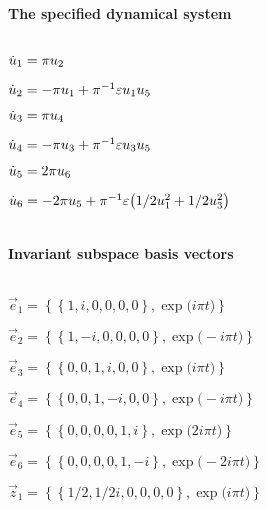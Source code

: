 
\(\)
\paragraph{The specified dynamical system}
\(
\)\par

\(\dot u_{1}=\pi  u\sb2
\)\par

\(\dot u_{2}=-\pi  u\sb1+\pi ^{-1} \varepsilon u\sb1 u\sb5
\)\par

\(\dot u_{3}=\pi  u\sb4
\)\par

\(\dot u_{4}=-\pi  u\sb3+\pi ^{-1} \varepsilon u\sb3 u\sb5
\)\par

\(\dot u_{5}=2 \pi  u\sb6
\)\par

\(\dot u_{6}=-2 \pi  u\sb5+\pi ^{-1} \varepsilon \big(1/2 u\sb1^{2}+1/2 u\sb3^{2}
\big)
\)\par

\(\)
\paragraph{Invariant subspace basis vectors}
\(
\)\par

\(\vec e_{1}=\left\{
\left\{
1 , i , 0 , 0 , 0 , 0
\right\} , \exp \big(i \pi  t\big)
\right\}
\)\par

\(\vec e_{2}=\left\{
\left\{
1 , -i , 0 , 0 , 0 , 0
\right\} , \exp \big(-i \pi  t\big)
\right\}
\)\par

\(\vec e_{3}=\left\{
\left\{
0 , 0 , 1 , i , 0 , 0
\right\} , \exp \big(i \pi  t\big)
\right\}
\)\par

\(\vec e_{4}=\left\{
\left\{
0 , 0 , 1 , -i , 0 , 0
\right\} , \exp \big(-i \pi  t\big)
\right\}
\)\par

\(\vec e_{5}=\left\{
\left\{
0 , 0 , 0 , 0 , 1 , i
\right\} , \exp \big(2 i \pi  t\big)
\right\}
\)\par

\(\vec e_{6}=\left\{
\left\{
0 , 0 , 0 , 0 , 1 , -i
\right\} , \exp \big(-2 i \pi  t\big)
\right\}
\)\par

\(\vec z_{1}=\left\{
\left\{
1/2 , 1/2 i , 0 , 0 , 0 , 0
\right\} , \exp \big(i \pi  t\big)
\right\}
\)\par

